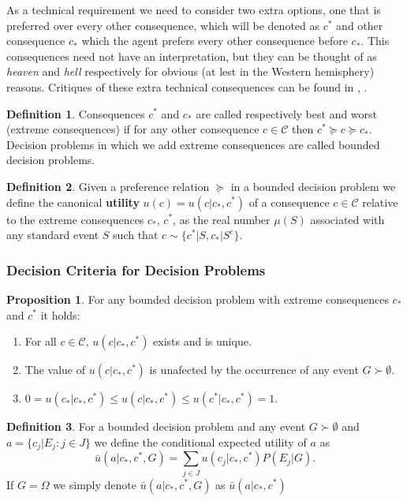 \documentclass[english,letterpaper,12pt,final]{article}
\theoremstyle{definition}
\newtheorem{prop}{Proposition}[section]
\newtheorem{defi}{Definition}[section]
\begin{document}
	As a technical requirement we need to consider two extra options, one that is preferred over every other consequence, which will be denoted as $c^\ast$ and other consequence $c_\ast$ which  the agent prefers every other consequence before $c_\ast$. This consequences need not have an interpretation, but they can be thought of as \textit{heaven} and \textit{hell} respectively for obvious (at lest in the Western hemisphery) reasons. Critiques of these extra technical consequences can be found in \cite{binmore2008rational}, \cite{peterson2017introduction}.
	\begin{defi}
	Consequences $c^\ast$ and $c_\ast$ are called respectively best and worst (extreme consequences) if for any other consequence $c \in \mathcal{C}$ then $c^\ast \succeq c \succeq c_\ast$. Decision problems in which we add extreme consequences are called bounded decision problems.
	\end{defi}
	\begin{defi}
	Given a preference relation $\succeq$ in a bounded decision problem we define the canonical \textbf{utility} $u(c)=u(c | c_\ast, c^\ast)$ of a consequence $c \in \mathcal{C}$ relative to the extreme consequences $c_\ast$, $c^\ast$, as the real number $\mu(S)$ associated with any standard event $S$ such that $c \sim \{c^\ast | S, c_\ast | S^c\}$.
	\end{defi}
	\subsubsection{Decision Criteria for Decision Problems}
	\begin{prop}
	For any bounded decision problem with extreme consequences $c_\ast$ and $c^\ast$ it holds:
	\begin{enumerate}[label=(\roman*)]
	\item For all $c \in \mathcal{C}$, $u(c | c_\ast, c^\ast)$ exists and is unique.
	\item The value of $u(c | c_\ast, c^\ast)$ is unafected by the occurrence of any event $G \succ \emptyset$.
	\item $0 = u(c_\ast | c_\ast, c^\ast) \leq u(c | c_\ast, c^\ast) \leq u(c^\ast | c_\ast, c^\ast) = 1$.
	\end{enumerate}
	\end{prop}
	\begin{defi}
	For a bounded decision problem and any event $G \succ \emptyset$ and $a = \{ c_j | E_j : j \in J \}$ we define the conditional expected utility of $a$ as
	\[ \bar{u}(a | c_\ast, c^\ast, G) = \sum_{j \in J} u(c_j | c_\ast, c^\ast)P(E_j | G). \]
	If $G = \Omega$ we simply denote $\bar{u}(a | c_\ast, c^\ast, G)$ as $\bar{u}(a | c_\ast, c^\ast)$
	\end{defi}
	
\end{document}
